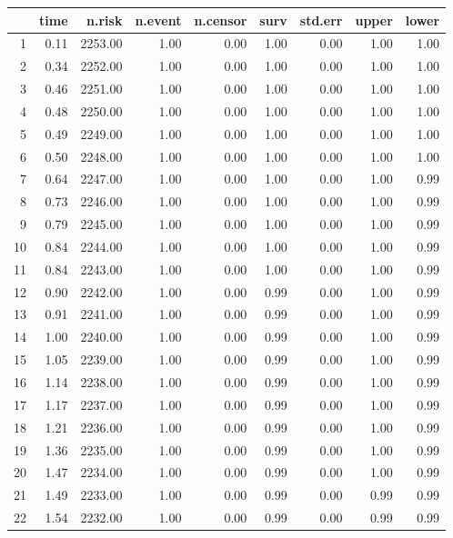 \documentclass{article}\usepackage[]{graphicx}\usepackage[]{color}
\begin{document}
\begin{longtable}{rrrrrrrrr}
  \hline
 & time & n.risk & n.event & n.censor & surv & std.err & upper & lower \\ 
  \hline
1 & 0.11 & 2253.00 & 1.00 & 0.00 & 1.00 & 0.00 & 1.00 & 1.00 \\ 
  2 & 0.34 & 2252.00 & 1.00 & 0.00 & 1.00 & 0.00 & 1.00 & 1.00 \\ 
  3 & 0.46 & 2251.00 & 1.00 & 0.00 & 1.00 & 0.00 & 1.00 & 1.00 \\ 
  4 & 0.48 & 2250.00 & 1.00 & 0.00 & 1.00 & 0.00 & 1.00 & 1.00 \\ 
  5 & 0.49 & 2249.00 & 1.00 & 0.00 & 1.00 & 0.00 & 1.00 & 1.00 \\ 
  6 & 0.50 & 2248.00 & 1.00 & 0.00 & 1.00 & 0.00 & 1.00 & 1.00 \\ 
  7 & 0.64 & 2247.00 & 1.00 & 0.00 & 1.00 & 0.00 & 1.00 & 0.99 \\ 
  8 & 0.73 & 2246.00 & 1.00 & 0.00 & 1.00 & 0.00 & 1.00 & 0.99 \\ 
  9 & 0.79 & 2245.00 & 1.00 & 0.00 & 1.00 & 0.00 & 1.00 & 0.99 \\ 
  10 & 0.84 & 2244.00 & 1.00 & 0.00 & 1.00 & 0.00 & 1.00 & 0.99 \\ 
  11 & 0.84 & 2243.00 & 1.00 & 0.00 & 1.00 & 0.00 & 1.00 & 0.99 \\ 
  12 & 0.90 & 2242.00 & 1.00 & 0.00 & 0.99 & 0.00 & 1.00 & 0.99 \\ 
  13 & 0.91 & 2241.00 & 1.00 & 0.00 & 0.99 & 0.00 & 1.00 & 0.99 \\ 
  14 & 1.00 & 2240.00 & 1.00 & 0.00 & 0.99 & 0.00 & 1.00 & 0.99 \\ 
  15 & 1.05 & 2239.00 & 1.00 & 0.00 & 0.99 & 0.00 & 1.00 & 0.99 \\ 
  16 & 1.14 & 2238.00 & 1.00 & 0.00 & 0.99 & 0.00 & 1.00 & 0.99 \\ 
  17 & 1.17 & 2237.00 & 1.00 & 0.00 & 0.99 & 0.00 & 1.00 & 0.99 \\ 
  18 & 1.21 & 2236.00 & 1.00 & 0.00 & 0.99 & 0.00 & 1.00 & 0.99 \\ 
  19 & 1.36 & 2235.00 & 1.00 & 0.00 & 0.99 & 0.00 & 1.00 & 0.99 \\ 
  20 & 1.47 & 2234.00 & 1.00 & 0.00 & 0.99 & 0.00 & 1.00 & 0.99 \\ 
  21 & 1.49 & 2233.00 & 1.00 & 0.00 & 0.99 & 0.00 & 0.99 & 0.99 \\ 
  22 & 1.54 & 2232.00 & 1.00 & 0.00 & 0.99 & 0.00 & 0.99 & 0.99 \\ 

\end{longtable}
\end{document}
